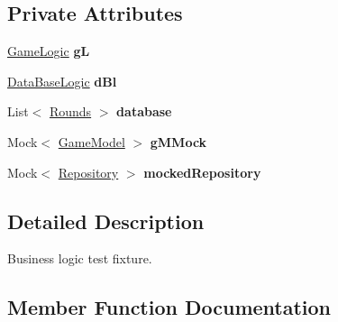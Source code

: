 \subsection*{Private Attributes}
\begin{DoxyCompactItemize}
\item 
\mbox{\label{class_bomberman_1_1_business_logic_1_1_tests_1_1_tests_a6b2c2e112c8ab898a88214d5a0549433}} 
\mbox{\hyperlink{class_bomberman_1_1_business_logic_1_1_game_logic}{Game\+Logic}} {\bfseries gL}
\item 
\mbox{\label{class_bomberman_1_1_business_logic_1_1_tests_1_1_tests_adb1842f4208718ef7d5ac8d5026c0a15}} 
\mbox{\hyperlink{class_bomberman_1_1_business_logic_1_1_data_base_logic}{Data\+Base\+Logic}} {\bfseries d\+Bl}
\item 
\mbox{\label{class_bomberman_1_1_business_logic_1_1_tests_1_1_tests_a08caa3ff176fa4f99b367c5142cb5d26}} 
List$<$ \mbox{\hyperlink{class_bomberman_1_1_data_1_1_rounds}{Rounds}} $>$ {\bfseries database}
\item 
\mbox{\label{class_bomberman_1_1_business_logic_1_1_tests_1_1_tests_a63eafe7459f3945784aba7f8941ba450}} 
Mock$<$ \mbox{\hyperlink{class_bomberman_1_1_business_logic_1_1_game_model}{Game\+Model}} $>$ {\bfseries g\+M\+Mock}
\item 
\mbox{\label{class_bomberman_1_1_business_logic_1_1_tests_1_1_tests_af33d977a289f5dcc07de8efe6dbbfa1e}} 
Mock$<$ \mbox{\hyperlink{class_bomberman_1_1_repository_1_1_repository}{Repository}} $>$ {\bfseries mocked\+Repository}
\end{DoxyCompactItemize}


\subsection{Detailed Description}
Business logic test fixture. 



\subsection{Member Function Documentation}
\mbox{\label{class_bomberman_1_1_business_logic_1_1_tests_1_1_tests_a2f5d51f70042cad096c98bce366e48b9}} 
